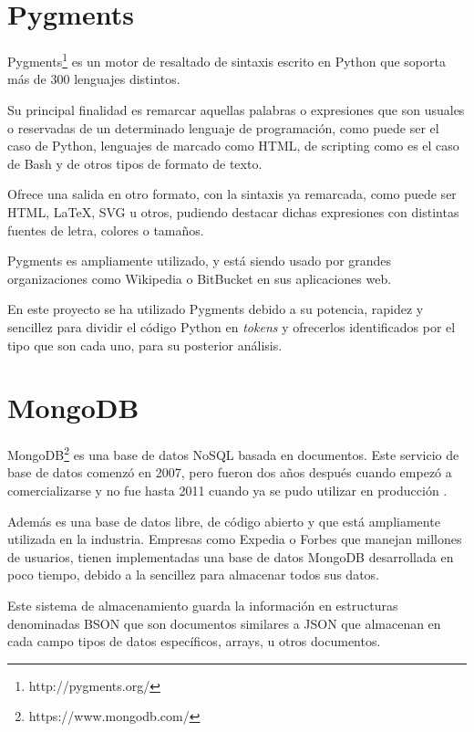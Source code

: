 \documentclass[a4paper, 12pt]{book}
\begin{document}
\section{Pygments} 
\label{sec:seccion3}
Pygments\footnote{http://pygments.org/} es un motor de resaltado de sintaxis escrito en Python que soporta más de 300 lenguajes distintos.

Su principal finalidad es remarcar aquellas palabras o expresiones que son usuales o reservadas de un determinado lenguaje de programación, como puede ser el caso de Python, lenguajes de marcado como HTML, de scripting como es el caso de Bash y de otros tipos de formato de texto. 

Ofrece una salida en otro formato, con la sintaxis ya remarcada, como puede ser HTML, LaTeX, SVG u otros, pudiendo destacar dichas expresiones con distintas fuentes de letra, colores o tamaños.

Pygments es ampliamente utilizado, y está siendo usado por grandes organizaciones como Wikipedia o BitBucket en sus aplicaciones web.


En este proyecto se ha utilizado Pygments debido a su potencia, rapidez y sencillez para dividir el código Python en \textit{tokens} y ofrecerlos identificados por el tipo que son cada uno, para su posterior análisis.



\section{MongoDB}
\label{sec:seccion4}
MongoDB\footnote{https://www.mongodb.com/} es una base de datos NoSQL basada en documentos. Este servicio de base de datos comenzó en 2007, pero fueron dos años después cuando empezó a comercializarse y no fue hasta 2011 cuando ya se pudo utilizar en producción \cite{banker2011mongodb}. 

Además es una base de datos libre, de código abierto y que está ampliamente utilizada en la industria. Empresas como Expedia o Forbes que manejan millones de usuarios, tienen implementadas una base de datos MongoDB desarrollada en poco tiempo, debido a la sencillez para almacenar todos sus datos.

Este sistema de almacenamiento guarda la información en estructuras denominadas BSON que son documentos similares a JSON que almacenan en cada campo tipos de datos específicos, arrays, u otros documentos.
\end{document}
